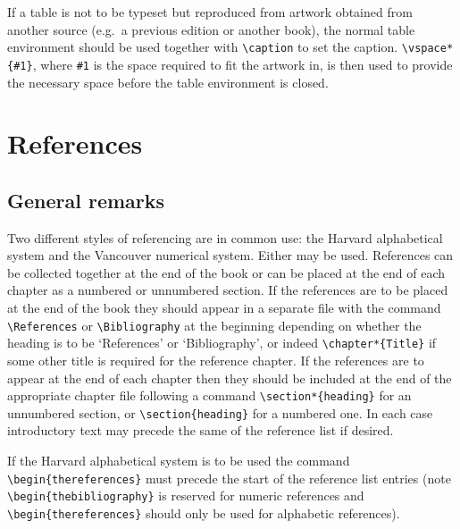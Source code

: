 If a table is not to be typeset but reproduced from artwork obtained from 
another source (e.g.\ a previous edition or another book), 
the normal table environment should be used together with \verb"\caption" 
to set the caption.
\verb"\vspace*{#1}", where \verb"#1" is the 
space required to fit the artwork in, is then used to provide the
necessary space before the table environment is closed.



\chapter{References}
\section{General remarks}
Two different styles of referencing are in common use: the 
Harvard 
alphabetical system and the Vancouver numerical 
system. Either may be 
used. References can be collected 
together at the end of the book or can be placed at the end of each 
chapter as a numbered or unnumbered section. 
If the 
references are to be placed at the end of the book they should appear 
in a separate file with  the command
\verb"\References" or \verb"\Bibliography" at the beginning depending
on whether the heading is to be `References' or
`Bibliography', or indeed \verb"\chapter*{Title}" if some other title is
required for the reference chapter. 
If the references are to appear at the end of each chapter 
then they should be 
included at the end of the appropriate chapter file following a
command \verb"\section*{heading}" for an unnumbered section, or 
\verb"\section{heading}" for a numbered one. In each case introductory
text may
precede the same of the reference list if desired.

If the Harvard alphabetical 
system is to be used the command 
\verb"\begin{thereferences}" must 
precede the start of the reference list entries (note
\verb"\begin{thebibliography}" is reserved for numeric references and
\verb"\begin{thereferences}" should only be used for alphabetic
references). 


